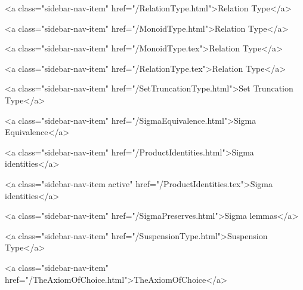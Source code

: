       
    
      
        
          <a class="sidebar-nav-item" href="/RelationType.html">Relation Type</a>
        
      
    
      
        
          <a class="sidebar-nav-item" href="/MonoidType.html">Relation Type</a>
        
      
    
      
        
          <a class="sidebar-nav-item" href="/MonoidType.tex">Relation Type</a>
        
      
    
      
        
          <a class="sidebar-nav-item" href="/RelationType.tex">Relation Type</a>
        
      
    
      
        
          <a class="sidebar-nav-item" href="/SetTruncationType.html">Set Truncation Type</a>
        
      
    
      
        
          <a class="sidebar-nav-item" href="/SigmaEquivalence.html">Sigma Equivalence</a>
        
      
    
      
        
          <a class="sidebar-nav-item" href="/ProductIdentities.html">Sigma identities</a>
        
      
    
      
        
          <a class="sidebar-nav-item active" href="/ProductIdentities.tex">Sigma identities</a>
        
      
    
      
        
          <a class="sidebar-nav-item" href="/SigmaPreserves.html">Sigma lemmas</a>
        
      
    
      
        
          <a class="sidebar-nav-item" href="/SuspensionType.html">Suspension Type</a>
        
      
    
      
        
          <a class="sidebar-nav-item" href="/TheAxiomOfChoice.html">TheAxiomOfChoice</a>
        
